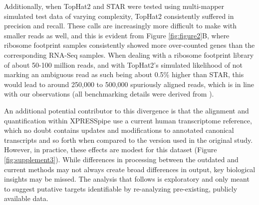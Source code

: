 \documentclass[10pt, oneside]{article}
\begin{document}
Additionally, when TopHat2 and STAR were tested using multi-mapper simulated test data of varying complexity, TopHat2 consistently suffered in precision and recall. These calls are increasingly more difficult to make with smaller reads as well, and this is evident from Figure \ref{fig:figure2}B, where ribosome footprint samples consistently showed more over-counted genes than the corresponding RNA-Seq samples. When dealing with a ribosome footprint library of about 50-100 million reads, and with TopHat2's simulated likelihood of not marking an ambiguous read as such being about 0.5\% higher than STAR, this would lead to around 250,000 to 500,000 spuriously aligned reads, which is in line with our observations (all benchmarking details were derived from \cite{alignment_benchmark}). \par

An additional potential contributor to this divergence is that the alignment and quantification within XPRESSpipe use a current human transcriptome reference, which no doubt contains updates and modifications to annotated canonical transcripts and so forth when compared to the version used in the original study. However, in practice, these effects are modest for this dataset (Figure \ref{fig:supplement3}). While differences in processing between the outdated and current methods may not always create broad differences in output, key biological insights may be missed. The analysis that follows is exploratory and only meant to suggest putative targets identifiable by re-analyzing pre-existing, publicly available data. \par
\end{document}

